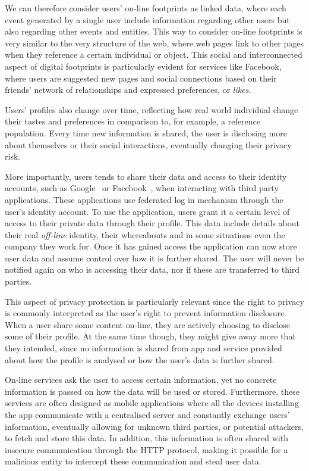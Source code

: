 We can therefore consider users' on-line footprints as linked data, where each event generated by a single user include information regarding other users but also regarding other events and entities. This way to consider on-line footprints is very similar to the very structure of the web, where web pages link to other pages when they reference a certain individual or object. This social and interconnected aspect of digital footprints is particularly evident for services like Facebook\cite{facebook}, where users are suggested new pages and social connections based on their friends' network of relationships and expressed preferences, or \emph{likes}.

Users' profiles also change over time, reflecting how real world individual change their tastes and preferences in comparison to, for example, a reference population. Every time new information is shared, the user is disclosing more about themselves or their social interactions, eventually changing their privacy risk.

More importantly, users tends to share their data and access to their identity accounts, such as Google~\cite{google} or Facebook~\cite{facebook}, when interacting with third party applications. These applications use federated log in mechanism through the user's identity account. To use the application, users grant it a certain level of access to their private data through their profile. This data include details about their real \emph{off-line} identity, their whereabouts and in some situations even the company they work for. Once it has gained access the application can now store user data and assume control over how it is further shared.  The  user  will never be notified again on who is accessing their data, nor if these are transferred to third parties.

This aspect of privacy protection is particularly relevant since the right to privacy is commonly interpreted as the user's right to prevent information disclosure. When a user share some content on-line, they are actively choosing to disclose some of their profile. At the same time though, they might give away more that they intended, since no information is shared from app and service provided about how the profile is analysed or how the user's data is further shared.

On-line services ask the user to access certain information, yet no concrete information is passed on how the data will be used or stored. Furthermore, these services are often designed as mobile applications where all the devices installing the  app communicate with a centralised server and constantly exchange users' information, eventually allowing for unknown third parties, or potential attackers, to fetch and store this data. In addition, this information is often shared with insecure communication through the HTTP protocol, making it possible for a malicious entity to intercept these communication and steal user data.

